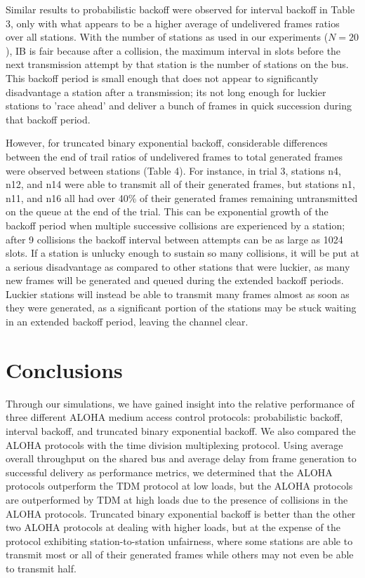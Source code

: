 \documentclass[twocolumn]{article}
\begin{document}
Similar results to probabilistic backoff were observed for interval backoff in Table 3, only 
with what appears to be a higher average of undelivered frames ratios over all stations. With
the number of stations as used in our experiments ($N=20$), IB is fair because
after a collision, the maximum interval in slots before the next transmission
attempt by that station is the number of stations on the bus. This backoff period is 
small enough that does not appear to significantly disadvantage a station after a transmission;
its not long enough for luckier stations to 'race ahead' and deliver a bunch of frames in 
quick succession during that backoff period.

However, for truncated binary exponential backoff, considerable differences
between the end of trail ratios of undelivered frames to total generated frames
were observed between stations (Table 4). For instance, in trial 3, stations n4,
n12, and n14 were able to transmit all of their generated frames, but stations
n1, n11, and n16 all had over 40\% of their generated frames remaining
untransmitted on the queue at the end of the trial. This can be exponential
growth of the backoff period when multiple successive collisions are experienced
by a station; after 9 collisions the backoff interval between attempts can be as
large as 1024 slots. If a station is unlucky enough to sustain so many
collisions, it will be put at a serious disadvantage as compared to other
stations that were luckier, as many new frames will be generated and queued
during the extended backoff periods. Luckier stations will instead be able to transmit many
frames almost as soon as they were generated, as a significant portion of the stations
may be stuck waiting in an extended backoff period, leaving the channel clear.

\section*{Conclusions}

Through our simulations, we have gained insight into the relative performance of
three different ALOHA medium access control protocols: probabilistic backoff, interval
backoff, and truncated binary exponential backoff. We also compared the ALOHA protocols
with the time division multiplexing protocol. Using average overall throughput on the shared
bus and average delay from frame generation to successful delivery as performance metrics, we
determined that the ALOHA protocols outperform the TDM protocol at low loads, but the ALOHA
protocols are outperformed by TDM at high loads due to the presence of collisions in the 
ALOHA protocols. Truncated binary exponential backoff is better than the other two ALOHA 
protocols at dealing with higher loads, but at the expense of the protocol exhibiting 
station-to-station unfairness, where some stations are able to transmit most or all of 
their generated frames while others may not even be able to transmit half.
\end{document}
